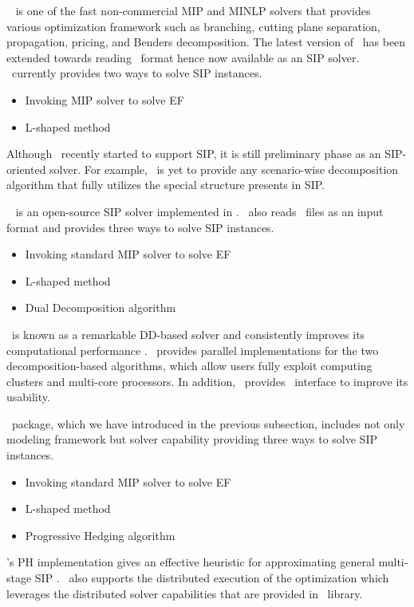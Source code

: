 \scip\ \cite{SCIP} is one of the fast non-commercial MIP and MINLP solvers that provides various optimization framework such as branching, cutting plane separation, propagation, pricing, and Benders decomposition. The latest version of \scip\ has been extended towards reading \smps\ format hence now available as an SIP solver. \scip\ currently provides two ways to solve SIP instances.
\begin{itemize}
	\item Invoking MIP solver to solve EF
	\item L-shaped method
\end{itemize}
Although \scip\ recently started to support SIP, it is still preliminary phase as an SIP-oriented solver. For example, \scip\ is yet to provide any scenario-wise decomposition algorithm that fully utilizes the special structure presents in SIP.

\dsp\ \cite{web:DSP} is an open-source SIP solver implemented in \cpp. \dsp\ also reads \smps\ files as an input format and provides three ways to solve SIP instances.
\begin{itemize}
	\item Invoking standard MIP solver to solve EF
	\item L-shaped method
	\item Dual Decomposition algorithm
\end{itemize}
\dsp\ is known as a remarkable DD-based solver and consistently improves its computational performance \cite{journal:KZ2015}. \dsp\ provides parallel implementations for the two decomposition-based algorithms, which allow users fully exploit computing clusters and multi-core processors. In addition, \dsp\ provides \julia\ interface to improve its usability.

\pysp\ package, which we have introduced in the previous subsection, includes not only modeling framework but solver capability providing three ways to solve SIP instances. 
\begin{itemize}
	\item Invoking standard MIP solver to solve EF
	\item L-shaped method
	\item Progressive Hedging algorithm
\end{itemize}
\pysp's PH implementation gives an effective heuristic for approximating general multi-stage SIP \cite{journal:WWH2012}. \pysp\ also supports the distributed execution of the optimization which leverages the distributed solver capabilities that are provided in \pyomo\ library.


